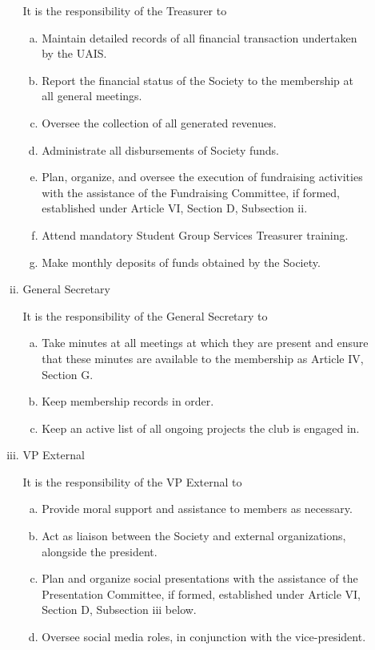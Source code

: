 \documentclass[11pt]{article}
\begin{document}
\begin{enumerate}[I.]
\begin{enumerate}[A)]
\begin{enumerate}[i)]
          It is the responsibility of the Treasurer to
            \begin{enumerate}[a)]
              \item Maintain detailed records of all financial transaction undertaken by the UAIS.
              \item Report the financial status of the Society to the membership at all general meetings.
              \item Oversee the collection of all generated revenues.
              \item Administrate all disbursements of Society funds.
              \item Plan, organize, and oversee the execution of fundraising activities with the assistance of the Fundraising Committee, if formed, established under Article VI, Section D, Subsection ii.
             \item Attend mandatory Student Group Services Treasurer training.
              \item Make monthly deposits of funds obtained by the Society.
            \end{enumerate}
        \item General Secretary
        
           It is the responsibility of the General Secretary to 
           \begin{enumerate}[a)]
              \item Take minutes at all meetings at which they are present and ensure that these minutes are available to the membership as Article IV, Section G.
              \item  Keep membership records in order.
              \item Keep an active list of all ongoing projects the club is engaged in.
            \end{enumerate}
          \item VP External

          It is the responsibility of the VP External to
            \begin{enumerate}[a)]
              \item Provide moral support and assistance to members as necessary.
              \item Act as liaison between the Society and external organizations, alongside the president.
               \item Plan and organize social presentations with the assistance of the Presentation Committee, if formed, established under Article VI, Section D, Subsection iii below.
          	\item Oversee social media roles, in conjunction with the vice-president.
            \end{enumerate}
            

\end{enumerate}
\end{enumerate}
\end{enumerate}
\end{document}
